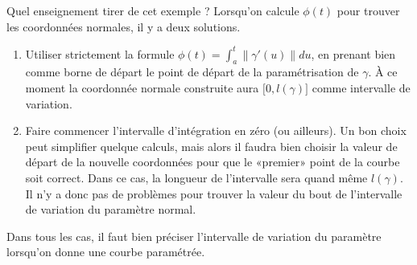 Quel enseignement tirer de cet exemple ? Lorsqu'on calcule $\phi(t)$ pour trouver les coordonnées normales, il y a deux solutions.
\begin{enumerate}
\item
    Utiliser strictement la formule $\phi(t)=\int_a^t\| \gamma'(u) \|du$, en prenant bien comme borne de départ le point de départ de la paramétrisation de $\gamma$. À ce moment la coordonnée normale construite aura $\mathopen[ 0 , l(\gamma) \mathclose]$ comme intervalle de variation.
\item
    Faire commencer l'intervalle d'intégration en zéro (ou ailleurs). Un bon choix peut simplifier quelque calculs, mais alors il faudra bien choisir la valeur de départ de la nouvelle coordonnées pour que le «premier» point de la courbe soit correct. Dans ce cas, la longueur de l'intervalle sera quand même $l(\gamma)$. Il n'y a donc pas de problèmes pour trouver la valeur du bout de l'intervalle de variation du paramètre normal.
\end{enumerate}
Dans tous les cas, il faut bien préciser l'intervalle de variation du paramètre lorsqu'on donne une courbe paramétrée.

